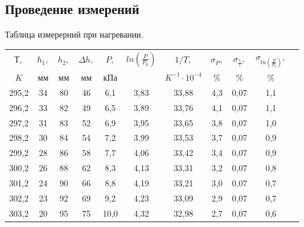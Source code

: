 \subsection{Проведение измерений}
Таблица измерерний при нагревании.
\begin{center}
\begin{tabular}{|c|c|c|c|c|c|c|c|c|c|c|}
\hline
 $  Т,   $ & $    h_1 , $ & $ h_2 ,    $ & $  \Delta h,   $  & $     P,     $ & $  ln(\frac{P}{P_0})         $ & $   1/T,   $ & $    \sigma_P,   $& $   \sigma_{\frac{1}{T}},    $ & $ \sigma_{ln(\frac{P}{P_0})}    ,   $  \\
  $ K   $ & $  мм $ & $  мм    $ & $   мм    $  & $     кПа     $ & $        $ & $    K^{-1} \cdot 10^{-4}   $ & $    \%   $  & $   \%        $& $  \%     $   \\
\hline 
       295,2   &  34        &    80       &    46      &    6,1   &   3,83  &    33,88       &   4,3       &      0,07     &           1,1           \\
\hline 
      296,2    &    33       &   82       &    49      &   6,5    &   3,89  &      33,76     &       4,1   &      0,07     &              1,1        \\
\hline 
        297,2  &     31     &     83      &        52  &     6,9  &   3,95  &    33,65       &     3,8     &       0,07    &             1,0        \\
\hline 
         298,2 &      30    &       84    &      54    &    7,2   &   3,99  &         33,53  &     3,7     &      0,07     &           0,9         \\
\hline 
         299,2 &       28   &      86     &   58       &   7,7    &   4,06  &      33,42     &       3,4   &      0,07     &           0,9           \\
\hline 
         300,2 &      26    &      88     &       62   &  8,3     & 4,13    &       33,31    &      3,2    &     0,07      &           0,8           \\
\hline 
         301,2 &   24       &    90       &     66     &    8,8  &  4,19   &      33,21     &      3,0    &     0,07      &            0,7          \\
\hline
       302,2   &     23     &     92      &    69      &     9,2  &   4,23  &      33,09     &      2,9    &      0,07     &             0,7         \\
\hline 
      303,2    &     20     &     95      &   75      &   10,0    &  4,32   &     32,98      &     2,7     &       0,07    &          0,6            \\

\end{tabular}
\end{center}
